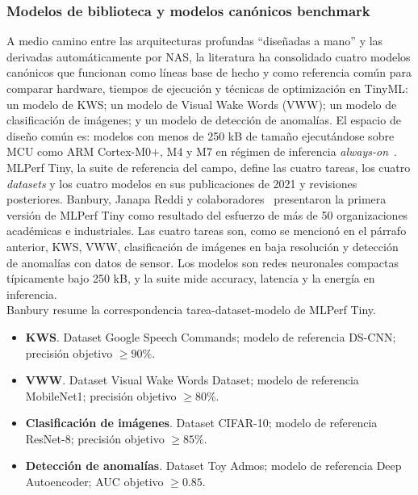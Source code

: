 \documentclass[a4paper,12pt,twoside,final]{book}
\begin{document}
\subsubsection{Modelos de biblioteca y modelos canónicos benchmark}
A medio camino entre las arquitecturas profundas ``diseñadas a mano'' y las derivadas automáticamente por NAS, la
literatura ha consolidado cuatro modelos canónicos que funcionan como líneas base de hecho y como referencia común
para comparar hardware, tiempos de ejecución y técnicas de optimización en TinyML: un modelo de KWS; un modelo de
Visual Wake Words (VWW); un modelo de clasificación de imágenes; y un modelo de detección de anomalías. El espacio de
diseño común es: modelos con menos de 250 kB de tamaño ejecutándose sobre MCU como ARM Cortex-M0$+$, M4 y M7 en régimen
de inferencia \textit{always-on}~\cite{somvanshi2025acm,banbury2020mlperf,banbury2021mlperf}.\\

MLPerf Tiny, la suite de referencia del campo, define las cuatro tareas, los cuatro \textit{datasets} y los cuatro
modelos en sus publicaciones de 2021 y revisiones posteriores. Banbury, Janapa Reddi y
colaboradores~\cite{banbury2021mlperf} presentaron la primera versión de MLPerf Tiny como resultado del esfuerzo de
más de 50 organizaciones académicas e industriales. Las cuatro tareas son, como se mencionó en el párrafo anterior,
KWS, VWW, clasificación de imágenes en baja resolución y detección de anomalías con datos de sensor.
Los modelos son redes neuronales compactas típicamente bajo 250 kB, y la suite mide accuracy, latencia y la energía
en inferencia.\\

Banbury resume la correspondencia tarea-dataset-modelo de MLPerf Tiny.
\begin{itemize}
  \item \textbf{KWS}. Dataset Google Speech Commands; modelo de referencia DS-CNN; precisión objetivo $\geq 90\%$.
  \item \textbf{VWW}. Dataset Visual Wake Words Dataset; modelo de referencia MobileNet1; precisión objetivo $\geq 80\%$.
  \item \textbf{Clasificación de imágenes}. Dataset CIFAR-10; modelo de referencia ResNet-8; precisión objetivo
  $\geq 85\%$.
  \item \textbf{Detección de anomalías}. Dataset Toy Admos; modelo de referencia Deep Autoencoder; AUC objetivo
  $\geq 0.85$.
\end{itemize}
\end{document}
